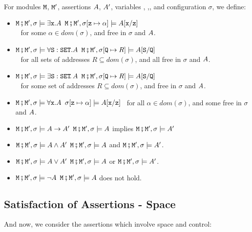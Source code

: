 \begin{definition}  
\label{def:valid:assertion:logical}
For modules $\M$, $\M'$, assertions $\A$, $\A'$, variables , ,,  and configuration $\sigma$, we define$:$
\begin{itemize}
\item
$\M\mkpair \M', \sigma \models \exists \prg{x}.\A$ \IFF
$\M\mkpair \M', \sigma[\prg{z}\mapsto \alpha] \models  \A[\prg{x}/\prg{z}]$\\
$\strut ~ $ \hfill for some  $\alpha\in dom(\sigma)$, and    free in $\sigma$ and $\A$.
\item
$\M\mkpair \M', \sigma \models \forall \prg{S}:\prg{SET}.\A$ \IFF  $\M\mkpair \M', \sigma[\prg{Q}\mapsto R] \models  \A[\prg{S}/\prg{Q}]$ \\
$\strut ~ $ \hfill for all sets of addresses $R\subseteq dom(\sigma)$, and  all  free in $\sigma$ and $\A$.
\item
$\M\mkpair \M', \sigma \models \exists \prg{S}:\prg{SET}\!.\,\A$ \IFF  $\M\mkpair \M', \sigma[\prg{Q}\mapsto R] \models  \A[\prg{S}/\prg{Q}]$ \\
 $\strut ~ $ \hfill  for some set of addresses $R\subseteq dom(\sigma)$, and    free in $\sigma$ and $\A$.
\item
$\M\mkpair \M', \sigma \models \forall \prg{x}.\A$ \IFF
$\sigma[\prg{z}\mapsto \alpha] \models  \A[\prg{x}/\prg{z}]$ \ for all  $\alpha\in dom(\sigma)$, and  some  free in $\sigma$ and $\A$.
\item
$\M\mkpair \M', \sigma \models \A \rightarrow \A' $ \IFF  $\M\mkpair \M', \sigma \models \A $ implies $\M\mkpair \M', \sigma \models \A' $
\item
$\M\mkpair \M', \sigma \models  \A \wedge \A'$   \IFF  $\M\mkpair \M', \sigma \models  \A $
and $\M\mkpair \M', \sigma \models  \A'$.
\item
$\M\mkpair \M', \sigma \models  \A \vee \A'$   \IFF  $\M\mkpair \M', \sigma \models  \A $
or $\M\mkpair \M', \sigma \models  \A'$.
\item
$\M\mkpair \M', \sigma \models  \neg\A$   \IFF  $\M\mkpair \M', \sigma \models  \A $
does not hold.
\end{itemize}
\end{definition}

\subsection{Satisfaction of Assertions - Space}
And now, we consider the assertions which involve space and  control:

